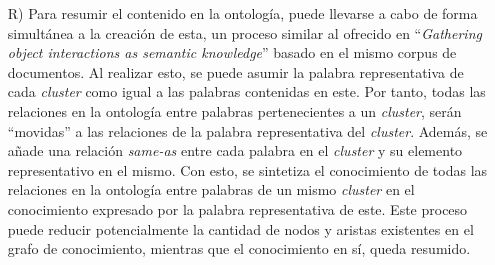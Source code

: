 \documentclass[12pt,oneside]{article}
\newcommand{\doublequote}[1]{``#1''}
\begin{document}
\begin{enumerate}
		\item[R)] Para resumir el contenido en la ontología, puede llevarse a cabo de forma simultánea a la creación de esta, un proceso similar al ofrecido en \doublequote{\textit{Gathering object interactions as semantic knowledge}}\cite{ref:2} basado en el mismo corpus de documentos. Al realizar esto, se puede asumir la palabra representativa de cada \textit{cluster} como igual a las palabras contenidas en este. Por tanto, todas las relaciones en la ontología entre palabras pertenecientes a un \textit{cluster}, serán \doublequote{movidas} a las relaciones de la palabra representativa del \textit{cluster}. Además, se añade una relación \textit{same-as} entre cada palabra en el \textit{cluster} y su elemento representativo en el mismo. Con esto, se sintetiza el conocimiento de todas las relaciones en la ontología entre palabras de un mismo \textit{cluster} en el conocimiento expresado por la palabra representativa de este. Este proceso puede reducir potencialmente la cantidad de nodos y aristas existentes en el grafo de conocimiento, mientras que el conocimiento en sí, queda resumido.
	\end{enumerate}

	\newpage

	
	
\end{document}
